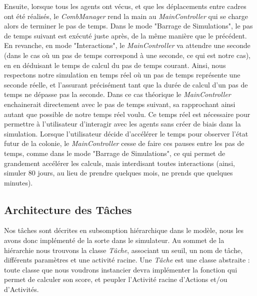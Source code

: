 			Ensuite, lorsque tous les agents ont vécus, et que les déplacements entre cadres ont été réalisés, le \textit{CombManager} rend la main au \textit{MainController} qui se charge alors de terminer le pas de temps. Dans le mode "Barrage de Simulations", le pas de temps suivant est exécuté juste après, de la même manière que le précédent. En revanche, en mode "Interactions", le \textit{MainController} va attendre une seconde (dans le cas où un pas de temps correspond à une seconde, ce qui est notre cas), en en déduisant le temps de calcul du pas de temps courant. Ainsi, nous respectons notre simulation en temps réel où un pas de temps représente une seconde réelle, et l'assurant précisément tant que la durée de calcul d'un pas de temps ne dépasse pas la seconde. Dans ce cas théorique le \textit{MainController} enchainerait directement avec le pas de temps suivant, sa rapprochant ainsi autant que possible de notre temps réel voulu. Ce temps réel est nécessaire pour permettre à l'utilisateur d'interagir avec les agents sans créer de biais dans la simulation. Lorsque l'utilisateur décide d'accélérer le temps pour observer l'état futur de la colonie, le \textit{MainController} cesse de faire ces pauses entre les pas de temps, comme dans le mode "Barrage de Simulations", ce qui permet de grandement accélérer les calculs, mais interdisant toutes interactions (ainsi, simuler 80 jours, au lieu de prendre quelques mois, ne prends que quelques minutes).
			
			\subsection{Architecture des Tâches}
			\label{subsectionImplemTasks}
			Nos tâches sont décrites en subsomption hiérarchique dans le modèle, nous les avons donc implémenté de la sorte dans le simulateur. Au sommet de la hiérarchie nous trouvons la classe \textit{Tâche}, associant un seuil, un nom de tâche, différents paramètres et une activité racine. Une \textit{Tâche} est une classe abstraite : toute classe que nous voudrons instancier devra implémenter la fonction qui permet de calculer son score, et peupler l'Activité racine d'Actions et/ou d'Activités.
			
